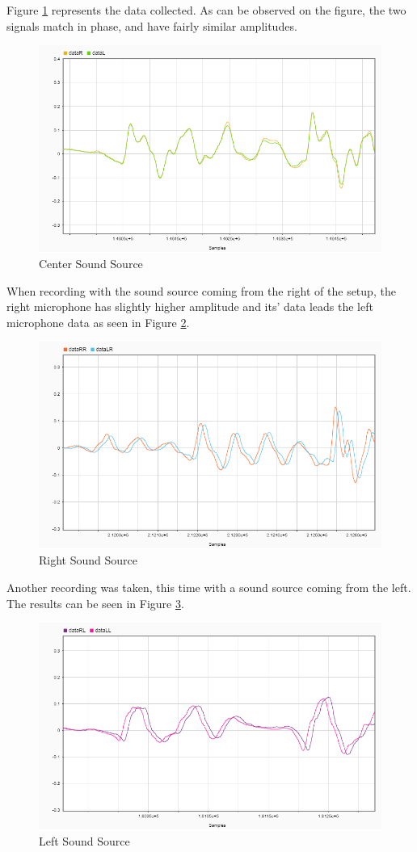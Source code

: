 Figure \ref{fig:C} represents the data collected. As can be observed on the figure, the two signals match in
phase, and have fairly similar amplitudes.
\begin{figure}[htp]
  \centering
  \includegraphics[width=0.8\linewidth]{Illustrations/DataC.png}
  \caption{Center Sound Source}
  \label{fig:C}
\end{figure}

\newpage

When recording with the sound source coming from the right of the setup, the right microphone has slightly higher amplitude and its' data leads
the left microphone data as seen in Figure \ref{fig:R}.

\begin{figure}[htp]
  \centering
  \includegraphics[width=0.8\linewidth]{Illustrations/DataR.png}
  \caption{Right Sound Source}
  \label{fig:R}
\end{figure}

Another recording was taken, this time with a sound source coming from the left. The results can be seen in
Figure \ref{fig:L}.

\begin{figure}[htp]
  \centering
  \includegraphics[width=0.8\linewidth]{Illustrations/DataL.png}
  \caption{Left Sound Source}
  \label{fig:L}
\end{figure}

